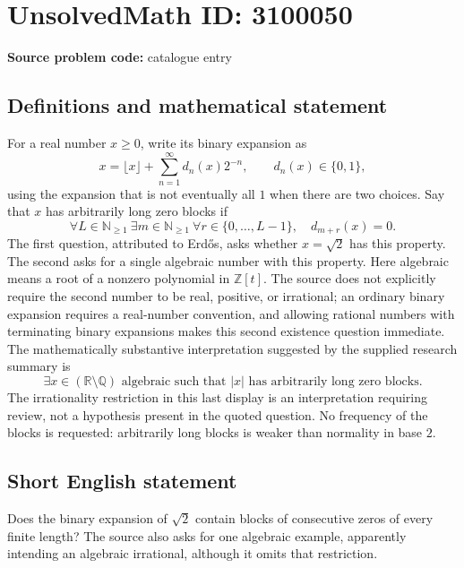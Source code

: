 \documentclass[11pt]{article}
\newcommand{\N}{\mathbb{N}}
\newcommand{\Z}{\mathbb{Z}}
\newcommand{\Q}{\mathbb{Q}}
\newcommand{\R}{\mathbb{R}}
\begin{document}
\section*{UnsolvedMath ID: 3100050}
\textbf{Source problem code:} catalogue entry
\subsection{Definitions and mathematical statement}
For a real number $x\geq0$, write its binary expansion as
\[
x=\lfloor x\rfloor+\sum_{n=1}^{\infty}d_n(x)2^{-n},\qquad d_n(x)\in\{0,1\},
\]
using the expansion that is not eventually all $1$ when there are two choices. Say that $x$ has arbitrarily long zero blocks if
\[
\forall L\in\N_{\geq1}\ \exists m\in\N_{\geq1}\ \forall r\in\{0,\ldots,L-1\},\quad d_{m+r}(x)=0.
\]
The first question, attributed to Erd\H{o}s, asks whether $x=\sqrt2$ has this property. The second asks for a single algebraic number with this property. Here algebraic means a root of a nonzero polynomial in $\Z[t]$. The source does not explicitly require the second number to be real, positive, or irrational; an ordinary binary expansion requires a real-number convention, and allowing rational numbers with terminating binary expansions makes this second existence question immediate. The mathematically substantive interpretation suggested by the supplied research summary is
\[
\exists x\in(\R\setminus\Q)\text{ algebraic such that }|x|\text{ has arbitrarily long zero blocks}.
\]
The irrationality restriction in this last display is an interpretation requiring review, not a hypothesis present in the quoted question. No frequency of the blocks is requested: arbitrarily long blocks is weaker than normality in base $2$.
\subsection{Short English statement}
Does the binary expansion of $\sqrt2$ contain blocks of consecutive zeros of every finite length? The source also asks for one algebraic example, apparently intending an algebraic irrational, although it omits that restriction.
\end{document}
